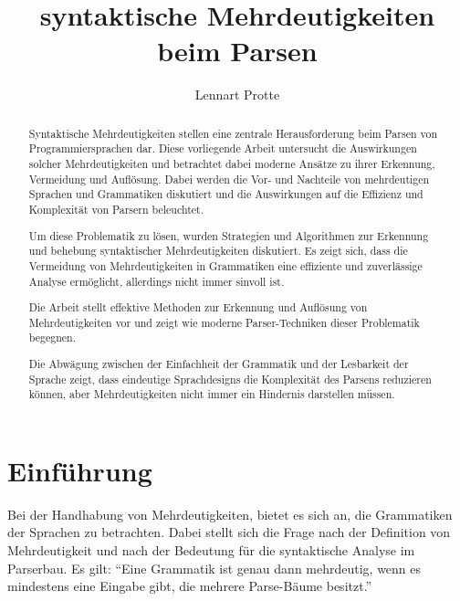 \documentclass[runningheads]{llncs}
\begin{document}
%
	\title{syntaktische Mehrdeutigkeiten beim Parsen}
%
%
	\author{Lennart Protte}
%
%
%
	\maketitle              %
%
	\begin{abstract}
		Syntaktische Mehrdeutigkeiten stellen eine zentrale Herausforderung beim Parsen von Programmiersprachen dar.
		Diese vorliegende Arbeit untersucht die Auswirkungen solcher Mehrdeutigkeiten
		und betrachtet dabei moderne Ansätze zu ihrer Erkennung, Vermeidung und Auflösung.
		Dabei werden die Vor- und Nachteile von mehrdeutigen Sprachen und Grammatiken diskutiert
		und die Auswirkungen auf die Effizienz und Komplexität von Parsern beleuchtet.

		Um diese Problematik zu lösen,
		wurden Strategien und Algorithmen zur Erkennung und behebung syntaktischer Mehrdeutigkeiten diskutiert.
		Es zeigt sich, dass die Vermeidung von Mehrdeutigkeiten in Grammatiken eine effiziente und zuverlässige Analyse ermöglicht,
		allerdings nicht immer sinvoll ist.

		Die Arbeit stellt effektive Methoden zur Erkennung und Auflösung von Mehrdeutigkeiten vor
		und zeigt wie moderne Parser-Techniken dieser Problematik begegnen.

		Die Abwägung zwischen der Einfachheit der Grammatik und der Lesbarkeit der Sprache zeigt,
		dass eindeutige Sprachdesigns die Komplexität des Parsens reduzieren können,
		aber Mehrdeutigkeiten nicht immer ein Hindernis darstellen müssen.

	\end{abstract}


	\section{Einführung}
	Bei der Handhabung von Mehrdeutigkeiten, bietet es sich an, die Grammatiken der Sprachen zu betrachten.
	Dabei stellt sich die Frage nach der Definition von Mehrdeutigkeit
	und nach der Bedeutung für die syntaktische Analyse im Parserbau.
	Es gilt: ``Eine Grammatik ist genau dann mehrdeutig, wenn es mindestens eine Eingabe gibt, die mehrere Parse-Bäume besitzt.''
\end{document}
